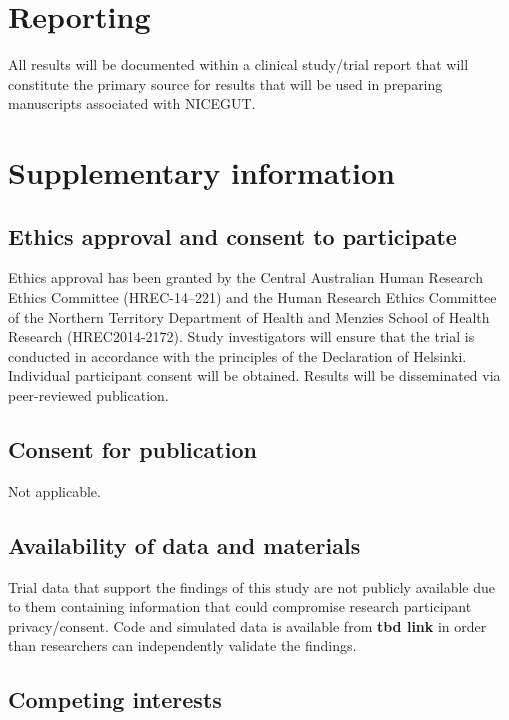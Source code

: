 \documentclass[a4paper]{article}
\begin{document}
\section{Reporting}

All results will be documented within a clinical study/trial report \cite{fda1996} that will constitute the primary source for results that will be used in preparing manuscripts associated with NICEGUT.

\section{Supplementary information}

\subsection{Ethics approval and consent to participate}

Ethics approval has been granted by the Central Australian Human Research Ethics Committee (HREC-14–221) and the Human Research Ethics Committee of the Northern Territory Department of Health and Menzies School of Health Research (HREC2014-2172).
Study investigators will ensure that the trial is conducted in accordance with the principles of the Declaration of Helsinki.
Individual participant consent will be obtained.
Results will be disseminated via peer-reviewed publication.

\subsection{Consent for publication}

Not applicable.

\subsection{Availability of data and materials}

Trial data that support the findings of this study are not publicly available due to them containing information that could compromise research participant privacy/consent.
Code and simulated data is available from \textbf{tbd link} in order than researchers can independently validate the findings.

\subsection{Competing interests} 
\end{document}
